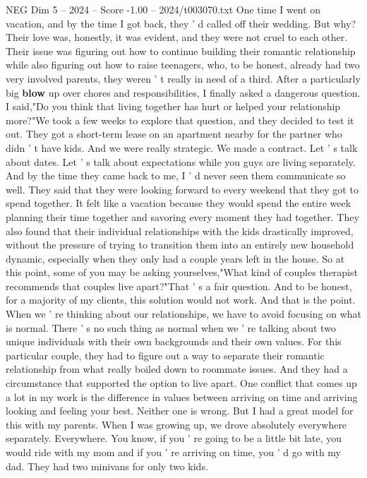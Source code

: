 \begin{textsample}{NEG Dim 5 – 2024 – Score -1.00 – 2024/t003070.txt}
One time I went on vacation, and by the time I got back, they ' d called off their wedding.
But why?
Their love was, honestly, it was evident, and they were not cruel to each other.
Their issue was figuring out how to continue building their romantic relationship while also figuring out how to raise teenagers, who, to be honest, already had two very involved parents, they weren ' t really in need of a third.
After a particularly big \textbf{blow} up over chores and responsibilities, I finally asked a dangerous question.
I said,"Do you think that living together has hurt or helped your relationship more?"We took a few weeks to explore that question, and they decided to test it out.
They got a short-term lease on an apartment nearby for the partner who didn ' t have kids.
And we were really strategic.
We made a contract.
Let ' s talk about dates.
Let ' s talk about expectations while you guys are living separately.
And by the time they came back to me, I ' d never seen them communicate so well.
They said that they were looking forward to every weekend that they got to spend together.
It felt like a vacation because they would spend the entire week planning their time together and savoring every moment they had together.
They also found that their individual relationships with the kids drastically improved, without the pressure of trying to transition them into an entirely new household dynamic, especially when they only had a couple years left in the house.
So at this point, some of you may be asking yourselves,"What kind of couples therapist recommends that couples live apart?"That ' s a fair question.
And to be honest, for a majority of my clients, this solution would not work.
And that is the point.
When we ' re thinking about our relationships, we have to avoid focusing on what is normal.
There ' s no such thing as normal when we ' re talking about two unique individuals with their own backgrounds and their own values.
For this particular couple, they had to figure out a way to separate their romantic relationship from what really boiled down to roommate issues.
And they had a circumstance that supported the option to live apart.
One conflict that comes up a lot in my work is the difference in values between arriving on time and arriving looking and feeling your best.
Neither one is wrong.
But I had a great model for this with my parents.
When I was growing up, we drove absolutely everywhere separately.
Everywhere.
You know, if you ' re going to be a little bit late, you would ride with my mom and if you ' re arriving on time, you ' d go with my dad.
They had two minivans for only two kids.

\end{textsample}
